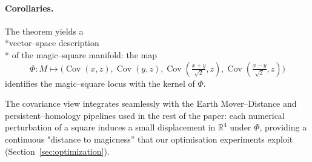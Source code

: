 \paragraph{Corollaries.}  The theorem yields a \\*vector–space description\\* of the magic–square manifold: the map
\[\Phi:M\mapsto \bigl(\operatorname{Cov}(x,z),\operatorname{Cov}(y,z),\operatorname{Cov}(\tfrac{x+y}{\sqrt2},z),\operatorname{Cov}(\tfrac{x-y}{\sqrt2},z)\bigr)\]
identifies the magic–square locus with the kernel of $\Phi$.

\medskip
The covariance view integrates seamlessly with the Earth Mover–Distance and persistent–homology pipelines used in the rest of the paper: each numerical perturbation of a square induces a small displacement in $\mathbb{R}^4$ under $\Phi$, providing a continuous "distance to magicness'' that our optimisation experiments exploit (Section~\ref{sec:optimization}). 
